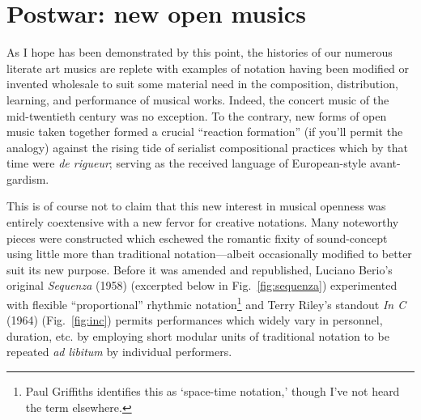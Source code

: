 
        
    
    \section[Postwar: new open musics]{Postwar: new open musics}

    As I hope has been demonstrated by this point, the histories of our numerous literate art musics are replete with examples of notation having been modified or invented wholesale to suit some material need in the composition, distribution, learning, and performance of musical works. Indeed, the concert music of the mid-twentieth century was no exception. To the contrary, new forms of open music taken together formed a crucial ``reaction formation'' (if you'll permit the analogy) against the rising tide of serialist compositional practices which by that time were \textit{de rigueur}; serving as the received language of European-style avant-gardism.\autocite[14--5]{Taruskin_2009d}

    This is of course not to claim that this new interest in musical openness was entirely coextensive with a new fervor for creative notations. Many noteworthy pieces were constructed which eschewed the romantic fixity of sound-concept using little more than traditional notation---albeit occasionally modified to better suit its new purpose. Before it was amended and republished, Luciano Berio's original \textit{Sequenza} (1958) (excerpted below in Fig.~\ref{fig:sequenza}) experimented with flexible ``proportional'' rhythmic notation\footnote{Paul Griffiths identifies this as `space-time notation,' though I've not heard the term elsewhere.} and Terry Riley's standout \textit{In C} (1964) (Fig.~\ref{fig:inc}) permits performances which widely vary in personnel, duration, etc. by employing short modular units of traditional notation to be repeated \textit{ad libitum} by individual performers.

